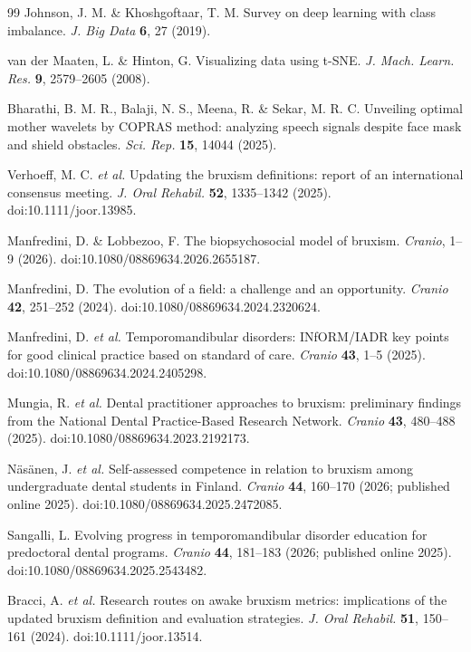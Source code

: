 \documentclass[pdflatex,sn-nature,iicol]{sn-jnl}
\begin{document}
\begin{thebibliography}{99}
Johnson, J. M. \& Khoshgoftaar, T. M. Survey on deep learning with class imbalance. \emph{J. Big Data} \textbf{6}, 27 (2019).

van der Maaten, L. \& Hinton, G. Visualizing data using t-SNE. \emph{J. Mach. Learn. Res.} \textbf{9}, 2579--2605 (2008).

Bharathi, B. M. R., Balaji, N. S., Meena, R. \& Sekar, M. R. C. Unveiling optimal mother wavelets by COPRAS method: analyzing speech signals despite face mask and shield obstacles. \emph{Sci. Rep.} \textbf{15}, 14044 (2025).

Verhoeff, M. C. \emph{et al.} Updating the bruxism definitions: report of an international consensus meeting. \emph{J. Oral Rehabil.} \textbf{52}, 1335--1342 (2025). doi:10.1111/joor.13985.

Manfredini, D. \& Lobbezoo, F. The biopsychosocial model of bruxism. \emph{Cranio}, 1--9 (2026). doi:10.1080/08869634.2026.2655187.

Manfredini, D. The evolution of a field: a challenge and an opportunity. \emph{Cranio} \textbf{42}, 251--252 (2024). doi:10.1080/08869634.2024.2320624.

Manfredini, D. \emph{et al.} Temporomandibular disorders: INfORM/IADR key points for good clinical practice based on standard of care. \emph{Cranio} \textbf{43}, 1--5 (2025). doi:10.1080/08869634.2024.2405298.

Mungia, R. \emph{et al.} Dental practitioner approaches to bruxism: preliminary findings from the National Dental Practice-Based Research Network. \emph{Cranio} \textbf{43}, 480--488 (2025). doi:10.1080/08869634.2023.2192173.

N\"as\"anen, J. \emph{et al.} Self-assessed competence in relation to bruxism among undergraduate dental students in Finland. \emph{Cranio} \textbf{44}, 160--170 (2026; published online 2025). doi:10.1080/08869634.2025.2472085.

Sangalli, L. Evolving progress in temporomandibular disorder education for predoctoral dental programs. \emph{Cranio} \textbf{44}, 181--183 (2026; published online 2025). doi:10.1080/08869634.2025.2543482.

Bracci, A. \emph{et al.} Research routes on awake bruxism metrics: implications of the updated bruxism definition and evaluation strategies. \emph{J. Oral Rehabil.} \textbf{51}, 150--161 (2024). doi:10.1111/joor.13514.


\end{thebibliography}
\end{document}
